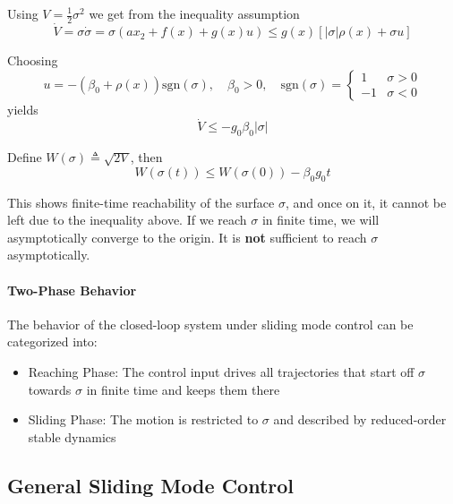 \newpar{}

Using $V = \frac{1}{2}\sigma^2$ we get from the inequality assumption
\begin{equation*}
    \dot{V} = \sigma\dot{\sigma} = \sigma(ax_2 + f(x) + g(x)u) \leq g(x)\left[|\sigma|\rho(x) + \sigma u\right]
\end{equation*}

\newpar{}

Choosing
\begin{equation*}
    u = -(\beta_0 + \rho(x))\text{sgn}(\sigma), \quad \beta_0 > 0,\quad \text{sgn}(\sigma) =
    \begin{cases}
        1  & \sigma > 0 \\
        -1 & \sigma < 0
    \end{cases}
\end{equation*}
yields
\begin{equation*}
    \dot{V} \leq -g_0\beta_0|\sigma|
\end{equation*}

\newpar{}

Define $W(\sigma) \triangleq \sqrt{2V}$, then
\begin{equation*}
    W(\sigma(t)) \leq W(\sigma(0)) - \beta_0g_0t
\end{equation*}

This shows finite-time reachability of the surface $\sigma$, and once on it, it cannot be left due to the inequality above. If we reach $\sigma$ in finite time, we will asymptotically converge to the origin. It is \textbf{not} sufficient to reach $\sigma$ asymptotically.

\paragraph{Two-Phase Behavior}

The behavior of the closed-loop system under sliding mode control can be categorized into:
\begin{itemize}
    \item Reaching Phase: The control input drives all trajectories that start off $\sigma$ towards $\sigma$ in finite time and keeps them there
    \item Sliding Phase: The motion is restricted to $\sigma$ and described by reduced-order stable dynamics
\end{itemize}

\subsection{General Sliding Mode Control}


